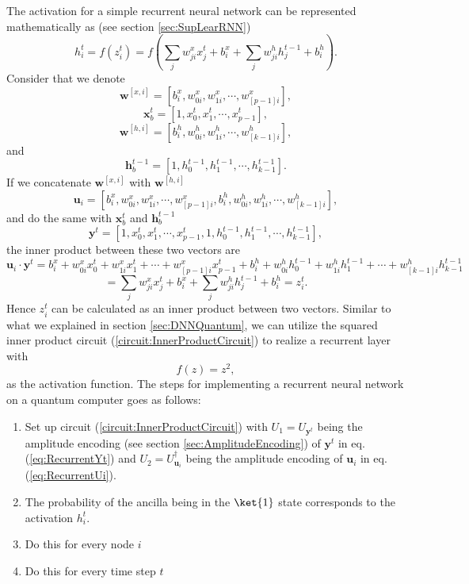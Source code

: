 The activation for a simple recurrent neural network can be represented mathematically as (see section \ref{sec:SupLearRNN})
$$h^t_i = f(z^t_i) = f(\sum_{j} w^x_{ji}x^t_j + b^x_i + \sum_j w^h_{ji}h^{t-1}_j + b^h_i). $$
Consider that we denote
$$\boldsymbol{w}^{[x,i]} = [b^x_i, w^{x}_{0i},w^{x}_{1i},\cdots,w^{x}_{[p-1]i}] ,$$
$$\boldsymbol{x}^{t}_b = [1, x^{t}_0,x^{t}_1,\cdots,x^{t}_{p-1}],$$
$$\boldsymbol{w}^{[h,i]} = [b^h_i, w^{h}_{0i},w^{h}_{1i},\cdots,w^{h}_{[k-1]i}], $$
and
$$\boldsymbol{h}^{t-1}_b = [1, h^{t-1}_0,h^{t-1}_1,\cdots,h^{t-1}_{k-1}].$$
If we concatenate $\boldsymbol{w}^{[x,i]}$ with $\boldsymbol{w}^{[h,i]}$
\begin{equation}
    \label{eq:RecurrentUi}
    \boldsymbol{u}_i = [b^x_i, w^{x}_{0i},w^{x}_{1i},\cdots,w^{x}_{[p-1]i},b^h_i, w^{h}_{0i},w^{h}_{1i},\cdots,w^{h}_{[k-1]i}],
\end{equation}
and do the same with $\boldsymbol{x}^{t}_b$ and $\boldsymbol{h}^{t-1}_b$
\begin{equation}
    \label{eq:RecurrentYt}
    \boldsymbol{y}^t = [1, x^{t}_0,x^{t}_1,\cdots,x^{t}_{p-1},1, h^{t-1}_0,h^{t-1}_1,\cdots,h^{t-1}_{k-1}],
\end{equation}
the inner product between these two vectors are
$$\boldsymbol{u}_i \cdot \boldsymbol{y}^t = b_i^x + w^x_{0i}x_0^t + w^x_{1i}x_1^t + \cdots + w^x_{[p-1]i}x^t_{p-1} + b_i^h + w^h_{0i}h^{t-1}_0 + w^h_{1i}h^{t-1}_1 + \cdots + w^h_{[k-1]i}h^{t-1}_{k-1}  $$
$$ = \sum_{j} w^x_{ji}x^t_j + b^x_i + \sum_j w^h_{ji}h^{t-1}_j + b^h_i = z_i^t. $$
Hence $z_i^t$ can be calculated as an inner product between two vectors. Similar to what we explained in section \ref{sec:DNNQuantum}, we can utilize the squared inner product circuit (\ref{circuit:InnerProductCircuit}) to realize a recurrent layer with
$$f(z) = z^2,$$ 
as the activation function.
The steps for implementing a recurrent neural network on a quantum computer goes as follows:
\begin{enumerate}[Step 1:]
\item Set up circuit (\ref{circuit:InnerProductCircuit}) with $U_1 = U_{ \boldsymbol{y}^t}$ being the amplitude encoding (see section \ref{sec:AmplitudeEncoding}) of $\boldsymbol{y}^t$ in eq. (\ref{eq:RecurrentYt}) and $U_2 = U^\dagger_{\boldsymbol{u}_i}$ being the amplitude encoding of $\boldsymbol{u}_i$ in eq. (\ref{eq:RecurrentUi}).
\item The probability of the ancilla being in the $\ket{1}$ state corresponds to the activation $h^t_i$.
\item Do this for every node $i$
\item Do this for every time step $t$
\end{enumerate}



